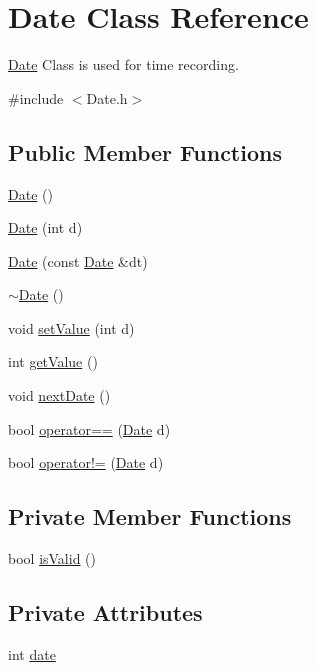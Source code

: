 \hypertarget{classDate}{\section{Date Class Reference}
\label{classDate}
}


\hyperlink{classDate}{Date} Class is used for time recording.  




{\ttfamily \#include $<$Date.\-h$>$}

\subsection*{Public Member Functions}
\begin{DoxyCompactItemize}
\item 
\hyperlink{classDate_a4e59ed4ba66eec61c27460c5d09fa1bd}{Date} ()
\item 
\hyperlink{classDate_a86d5d0d04d211f5fa077386de1ce7f19}{Date} (int d)
\item 
\hyperlink{classDate_a2233b93eaed1626e957435cedfc511de}{Date} (const \hyperlink{classDate}{Date} \&dt)
\item 
\hyperlink{classDate_ade4b469433b7966cc034cbcc6799233b}{$\sim$\-Date} ()
\item 
void \hyperlink{classDate_a33ea2c0c7bd11cc5fa95ad7d346fcff4}{set\-Value} (int d)
\item 
int \hyperlink{classDate_ab92e73e4246833b2e66b373ef3fefdf0}{get\-Value} ()
\item 
void \hyperlink{classDate_a689d13b5e5882068308b02073e1ed321}{next\-Date} ()
\item 
bool \hyperlink{classDate_a0036e87463cdee6117d27f04933393fb}{operator==} (\hyperlink{classDate}{Date} d)
\item 
bool \hyperlink{classDate_a5d7fa843430ed6a618b104b2f9ce8f03}{operator!=} (\hyperlink{classDate}{Date} d)
\end{DoxyCompactItemize}
\subsection*{Private Member Functions}
\begin{DoxyCompactItemize}
\item 
bool \hyperlink{classDate_a7d9aaa9db591413e21c8b85fdae130ad}{is\-Valid} ()
\end{DoxyCompactItemize}
\subsection*{Private Attributes}
\begin{DoxyCompactItemize}
\item 
int \hyperlink{classDate_abfe1e095c0de4e7d1ce6ae1ac97026d5}{date}
\end{DoxyCompactItemize}


